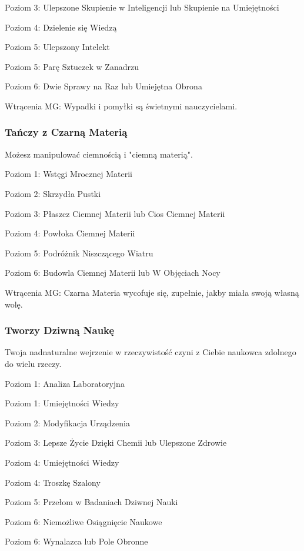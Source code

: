 Poziom 3: Ulepszone Skupienie w Inteligencji lub Skupienie na Umiejętności

Poziom 4: Dzielenie się Wiedzą

Poziom 5: Ulepszony Intelekt

Poziom 5: Parę Sztuczek w Zanadrzu

Poziom 6: Dwie Sprawy na Raz lub Umiejętna Obrona

Wtrącenia MG: Wypadki i pomyłki są świetnymi nauczycielami.

\subsubsection{Tańczy z Czarną Materią}

Możesz manipulować ciemnością i "ciemną materią".

Poziom 1:  Wstęgi Mrocznej Materii

Poziom 2: Skrzydła Pustki

Poziom 3: Płaszcz Ciemnej Materii lub Cios Ciemnej Materii

Poziom 4: Powłoka Ciemnej Materii

Poziom 5: Podróżnik Niszczącego Wiatru

Poziom 6: Budowla Ciemnej Materii lub W Objęciach Nocy

Wtrącenia MG: Czarna Materia wycofuje się, zupełnie, jakby miała swoją własną wolę. 

\subsubsection{Tworzy Dziwną Naukę}

Twoja nadnaturalne wejrzenie w rzeczywistość czyni z Ciebie naukowca zdolnego do wielu rzeczy.

Poziom 1: Analiza Laboratoryjna

Poziom 1: Umiejętności Wiedzy

Poziom 2: Modyfikacja Urządzenia

Poziom 3: Lepsze Życie Dzięki Chemii lub Ulepszone Zdrowie

Poziom 4: Umiejętności Wiedzy

Poziom 4: Troszkę Szalony

Poziom 5: Przełom w Badaniach Dziwnej Nauki

Poziom 6: Niemożliwe Osiągnięcie Naukowe

Poziom 6: Wynalazca lub Pole Obronne

